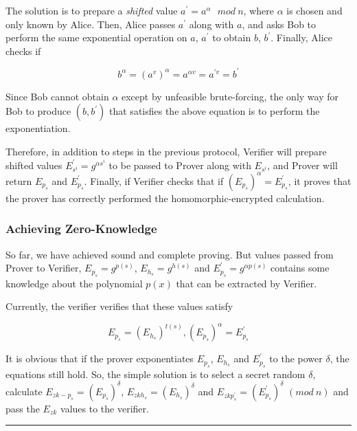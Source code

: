\documentclass[
]{report}
\begin{document}
The solution is to prepare a \emph{shifted} value
\(a^{'} = a^{\alpha}\ \ \ mod\ n\), where \(\alpha\) is chosen and only
known by Alice. Then, Alice passes \(a^{'}\) along with \(a\), and asks
Bob to perform the same exponential operation on \(a\), \(a^{'}\) to
obtain \(b\), \(b^{'}\). Finally, Alice checks if

\[b^{\alpha} = \left( a^{v} \right)^{\alpha} = a^{\alpha v} = a^{'v} = b^{'}\]

Since Bob cannot obtain \(\alpha\) except by unfeasible brute-forcing,
the only way for Bob to produce \(\left( b,b^{'} \right)\) that
satisfies the above equation is to perform the exponentiation.

Therefore, in addition to steps in the previous protocol, Verifier will
prepare shifted values \(E_{s^{i}}^{'} = g^{\alpha s^{i}}\) to be passed
to Prover along with \(E_{s^{i}}\), and Prover will return \(E_{p_{s}}\)
and \(E_{p_{s}}^{'}\). Finally, if Verifier checks that if
\(\left( E_{p_{s}} \right)^{\alpha} = E_{p_{s}}^{'}\), it proves that
the prover has correctly performed the homomorphic-encrypted
calculation.

\subsubsection{Achieving Zero-Knowledge}

So far, we have achieved sound and complete proving. But values passed
from Prover to Verifier, \(E_{p_{s}} = g^{p(s)}\),
\(E_{h_{s}} = g^{h(s)}\) and \(E_{p_{s}}^{'} = g^{\alpha p(s)}\)
contains some knowledge about the polynomial \(p(x)\) that can be
extracted by Verifier.

Currently, the verifier verifies that these values satisfy

\[E_{p_{s}} = \left( E_{h_{s}} \right)^{t(s)},\left( E_{p_{s}} \right)^{\alpha} = E_{p_{s}}^{'}\]

It is obvious that if the prover exponentiates \(E_{p_{s}}\),
\(E_{h_{s}}\) and \(E_{p_{s}}^{'}\) to the power \(\delta\), the
equations still hold. So, the simple solution is to select a secret
random \(\delta\), calculate
\(E_{zk - p_{s}} = \left( E_{p_{s}} \right)^{\delta}\),
\(E_{zkh_{s}} = \left( E_{h_{s}} \right)^{\delta}\) and
\(E_{zkp_{s}^{'}} = \left( E_{p_{s}}^{'} \right)^{\delta}\) \((mod\ n)\)
and pass the \(E_{zk}\) values to the verifier.

\begin{center}\rule{0.5\linewidth}{0.5pt}\end{center}
\end{document}
